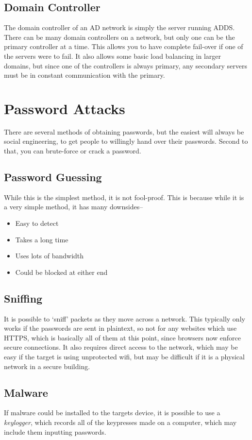 \subsection*{Domain Controller}

The domain controller of an AD network is simply the server running ADDS. There can be many domain controllers on a
 network, but only one can be the primary controller at a time. This allows you to have complete fail-over if one of the
 servers were to fail. It also allows some basic load balancing in larger domains, but since one of the controllers is
 always primary, any secondary servers must be in constant communication with the primary.

\section*{Password Attacks}

There are several methods of obtaining passwords, but the easiest will always be social engineering, to get people to
 willingly hand over their passwords. Second to that, you can brute-force or crack a password.

\subsection*{Password Guessing}

While this is the simplest method, it is not fool-proof. This is because while it is a very simple method, it has many
 downsides--
\begin{itemize}
  \item Easy to detect
  \item Takes a long time
  \item Uses lots of bandwidth
  \item Could be blocked at either end
\end{itemize}

\subsection*{Sniffing}

It is possible to `sniff' packets as they move across a network. This typically only works if the passwords are sent in
 plaintext, so not for any websites which use HTTPS, which is basically all of them at this point, since browsers now
 enforce secure connections. It also requires direct access to the network, which may be easy if the target is using
 unprotected wifi, but may be difficult if it is a physical network in a secure building.

\subsection*{Malware}

If malware could be installed to the targets device, it is possible to use a \textit{keylogger}, which records all of
 the keypresses made on a computer, which may include them inputting passwords.